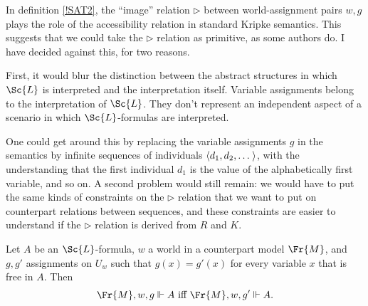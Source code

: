 \documentclass[11pt]{woarticle}
\newcommand{\cmnt}[1]{\iffalse #1 \fi}
\theoremstyle{break}
\theoremstyle{nonumberplain}
\newcommand{\SAT}{\Vdash}
\newcommand{\Img}{\triangleright}
\newcommand{\1}{\;\,|\;\,}
\renewcommand{\t}[1]{\ensuremath{\langle #1  \makebox[.2ex]{}\rangle}}
\begin{document}
\cmnt{%
  \begin{definition}[(Semantic) Consequence]\label{semcons}
    Let $\mathbb{C}$ be a set of models or structures. A formula $A$ is a
    \emph{(local) consequence} of a set of formulas $\Gamma$ \emph{in}
    $\mathbb{C}$ iff for all worlds $w$ in all models in $\mathbb{C}$, whenever
    all members of $\Gamma$ are true at $w$, then so is $A$. Two formulas $A$
    and $B$ are \emph{(locally) equivalent in} $\mathbb{C}$ iff they are
    consequences of one another in $\mathbb{C}$.
  \end{definition}
} %

In definition \ref{!SAT2}, the ``image'' relation $\Img$ between
world-assignment pairs $w,g$ plays the role of the accessibility relation in
standard Kripke semantics. This suggests that we could take the $\Img$ relation
as primitive, as some authors do. I have decided against this, for two reasons.

First, it would blur the distinction between the abstract structures in which
$\Sc{L}$ is interpreted and the interpretation itself. Variable assignments
belong to the interpretation of $\Sc{L}$. They don't represent an independent
aspect of a scenario in which $\Sc{L}$-formulas are interpreted.

One could get around this by replacing the variable assignments $g$ in the
semantics by infinite sequences of individuals $\t{d_{1},d_{2},\ldots}$, with
the understanding that the first individual $d_{1}$ is the value of the
alphabetically first variable, and so on. A second problem would still remain:
we would have to put the same kinds of constraints on the $\Img$ relation that
we want to put on counterpart relations between sequences, and these constraints
are easier to understand if the $\Img$ relation is derived from $R$ and
$K$. \label{p:tarski-semantics}

\begin{lemma}\label{locality}
  Let $A$ be an $\Sc{L}$-formula, $w$ a world in a counterpart model $\Fr{M}$,
  and $g, g'$ assignments on $U_{w}$ such that $g(x) = g'(x)$ for every variable
  $x$ that is free in $A$. Then
  \[
  \Fr{M},w,g \SAT A \text{ iff } \Fr{M},w,g' \SAT A.
  \]
\end{lemma}
\end{document}
